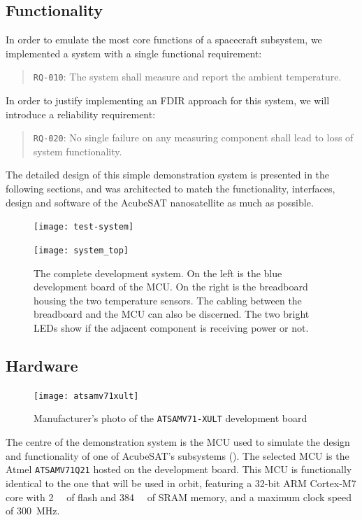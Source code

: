 \documentclass[a4paper,nobib]{tufte-book}
\begin{document}
\subsection{Functionality}
\label{sec:tsvcd}

In order to emulate the most core functions of a spacecraft subsystem, we implemented a system with a single functional requirement:
\begin{quote}
	\texttt{RQ-010}: The system shall measure and report the ambient temperature.
\end{quote}

In order to justify implementing an \ac{FDIR} approach for this system, we will introduce a reliability requirement:
\begin{quote}
	\texttt{RQ-020}: No single failure on any measuring component shall lead to loss of system functionality.
\end{quote}

The detailed design of this simple demonstration system is presented in the following sections, and was architected to match the functionality, interfaces, design and software of the AcubeSAT nanosatellite as much as possible.

\begin{figure}
	\texttt{[image: test-system]}\par
	\vspace*{3ex}
	\texttt{[image: system\_top]}
	\caption[The complete development system]{The complete development system. On the left is the blue development board of the \acs{MCU}. On the right is the breadboard housing the two temperature sensors. The cabling between the breadboard and the \acs{MCU} can also be discerned. The two bright \acsp{LED} show if the adjacent component is receiving power or not.}
\end{figure}

\subsection{Hardware}

\begin{figure}
      \centering
      \texttt{[image: atsamv71xult]}
      \caption{Manufacturer's photo of the \texttt{ATSAMV71-XULT} development board}
\end{figure}


The centre of the demonstration system is the \ac{MCU} used to simulate the design and functionality of one of AcubeSAT's subsystems (). The selected \ac{MCU} is the Atmel \texttt{ATSAMV71Q21} hosted on the  development board. This \ac{MCU} is functionally identical to the one that will be used in orbit, featuring a 32-bit ARM Cortex-M7 core with \SI{2}{\mebi\byte} of flash and \SI{384}{\kibi\byte} of \acs{SRAM} memory, and a maximum clock speed of \SI{300}{\mega\hertz}.
\end{document}
